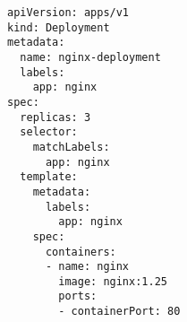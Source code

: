 \begin{verbatim}
apiVersion: apps/v1
kind: Deployment
metadata:
  name: nginx-deployment
  labels:
    app: nginx
spec:
  replicas: 3
  selector:
    matchLabels:
      app: nginx
  template:
    metadata:
      labels:
        app: nginx
    spec:
      containers:
      - name: nginx
        image: nginx:1.25
        ports:
        - containerPort: 80
\end{verbatim}
